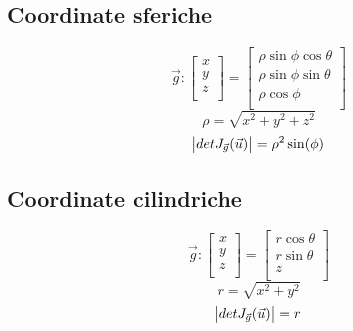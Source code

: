 \documentclass[a4paper,portrait,columns=3,5pt]{cheatsheet}
\begin{document}
\subsection{Coordinate sferiche}
\begin{equation*}
	\vec{g} :
	\begin{bmatrix}
		x \\
		y \\
		z \\
	\end{bmatrix} =
	\begin{bmatrix}
		\rho \sin \phi \cos \theta \\
		\rho \sin \phi \sin \theta \\
		\rho \cos \phi             \\
	\end{bmatrix}
\end{equation*}
\begin{equation*}
	\rho = \sqrt{x^2 + y^2 + z^2}
\end{equation*}
\begin{equation*}
	\abs{detJ_{\vec{g}}(\vec{u})} = \rho^2 \sin(\phi)
\end{equation*}
\subsection{Coordinate cilindriche}
\begin{equation*}
	\vec{g} :
	\begin{bmatrix}
		x \\
		y \\
		z \\
	\end{bmatrix} =
	\begin{bmatrix}
		r \cos \theta \\
		r \sin \theta \\
		z             \\
	\end{bmatrix}
\end{equation*}
\begin{equation*}
	r = \sqrt{x^2 + y^2}
\end{equation*}
\begin{equation*}
	\abs{detJ_{\vec{g}}(\vec{u})} = r
\end{equation*}
\end{document}
